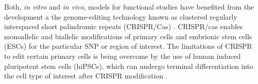Both, \textit{in vitro} and \textit{in vivo}, models for functional studies have benefited from the development a the genome-editing technology known as clustered regularly interspaced short palindromic repeats (CRISPR/Cas) \parencite{Cong2013}. CRISPR/cas enables monoallelic and biallelic modifications of primary cells and embrionic stem cells (ESCs) for the particular SNP or region of interest. The limitations of CRISPR to edit certain primary cells is being overcome by the use of human induced pluripotent stem cells (hiPSCs), which can undergo terminal differentiation into the cell type of interest after CRISPR modification \parencite{Ding2013}. 





